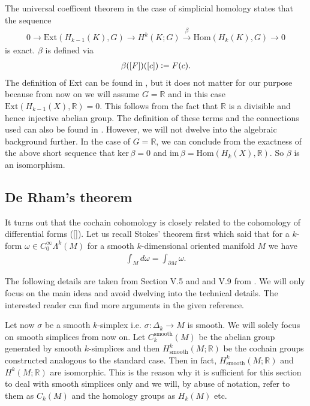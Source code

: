 \documentclass[12pt,a4paper]{article}
\numberwithin{equation}{subsection}
\numberwithin{lemma}{subsection}
\theoremstyle{definition}
\newcommand{\smoothcompforms}[2]{C_0^\infty \Lambda^{#1}(#2)}
\newcommand{\real}{\mathbb{R}}
\begin{document}
The universal coefficent theorem in the case of simplicial homology states
that the sequence 
\begin{align}
    0 \rightarrow \text{Ext}(H_{k-1}(K),G) \rightarrow 
    H^k(K;G) \xrightarrow{\beta} \text{Hom}(H_k(K),G) 
    \rightarrow 0 \label{eq:univeral_coefficient_theorem}
\end{align}
is exact. 
$\beta$ is defined via 
\begin{align}
    \beta([F])([c]) \vcentcolon= F(c).
    \label{eq:isomorphism_from_universal_coefficent_theorem}
\end{align}
The definition of Ext can be found in \cite{topology_and_geometry},
but it does not matter for our purpose because from now on we will assume
$G = \real$ and in this case
$\text{Ext}(H_{k-1}(X),\real) = 0$. This follows from the fact that 
$\real$ is a divisible and hence injective abelian group. The definition of
these terms and the connections used can also be found in 
\cite[Sec.\,V.6]{topology_and_geometry}. However, we will not dwelve into the 
algebraic background further. In the case of $G = \real$, 
we can conclude from the exactness of the 
above short sequence that $\text{ker}\,\beta = 0$ and 
$\text{im}\,\beta = \text{Hom}(H_k(X),\real)$. So $\beta$ is an isomorphism.


\subsection{De Rham's theorem} \label{sec:de_rhams_theorem}

It turns out that the cochain cohomology is closely related to the cohomology 
of differential forms (\ref{}). Let us recall Stokes' theorem first which said 
that for a $k$-form $\omega \in \smoothcompforms{k}{M}$ 
for a smooth $k$-dimensional oriented manifold $M$ we have 
\begin{align*}
    \int_M d\omega = \int_{\partial M} \omega.
\end{align*}

The following details are taken from Section V.5 and and V.9 from 
\cite{topology_and_geometry}. We will only focus on the main ideas and avoid 
dwelving into the technical details. The interested reader can find more 
arguments in the given reference.

Let now $\sigma$ be a smooth $k$-simplex i.e. $\sigma: \Delta_k \rightarrow 
M$ is smooth. We will solely focus on smooth simplices from now on. Let 
$C_k^{\text{smooth}}(M)$ be the abelian group generated by smooth $k$-simplices and 
then $H^k_{\text{smooth}}(M;\real)$ be the cochain groups constructed analogous to the 
standard case. Then in fact, 
$H^k_{\text{smooth}}(M;\real)$ and $H^k(M;\real)$ are isomorphic. This 
is the reason why it is sufficient for this section to deal with smooth simplices 
only and we will, by abuse of notation, refer to them as $C_k(M)$
and the homology groups as $H_k(M)$ etc.
\end{document}
